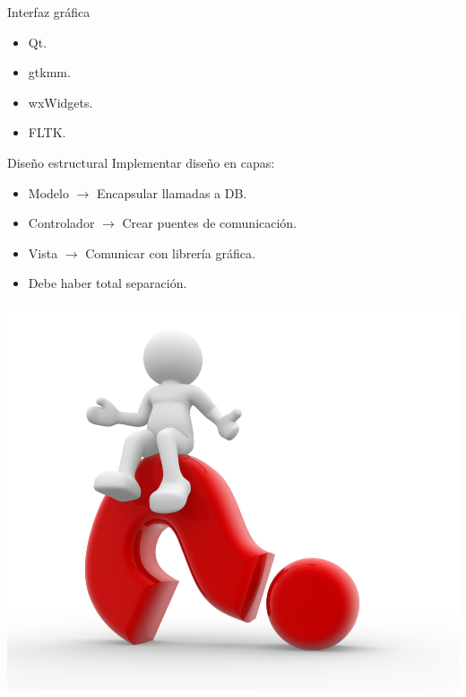 \begin{frame}{Interfaz gráfica}
  \begin{itemize}
    \item Qt.
    \item gtkmm.
    \item wxWidgets.
    \item FLTK.
  \end{itemize}
\end{frame}

\begin{frame}{Diseño estructural}
  Implementar diseño en capas:
  \begin{itemize}
    \item Modelo $\rightarrow$ Encapsular llamadas a DB.
    \item Controlador $\rightarrow$ Crear puentes de comunicación.
    \item Vista $\rightarrow$ Comunicar con librería gráfica.
    \item Debe haber total separación.
  \end{itemize}

  \begin{center}
    \includegraphics[scale=0.5]{img/ed_realization}
  \end{center}
\end{frame}
